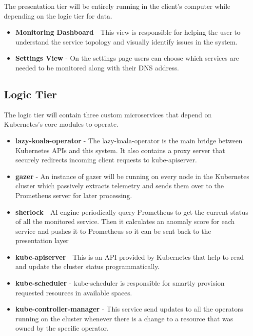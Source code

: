 The presentation tier will be entirely running in the client's computer while depending on the logic tier for data.

\begin{itemize}
    \item \textbf{Monitoring Dashboard} - This view is responsible for helping the user to understand the service topology and visually identify issues in the system.
    \item \textbf{Settings View} - On the settings page users can choose which services are needed to be monitored along with their DNS address.
\end{itemize}

\subsection{Logic Tier}

The logic tier will contain three custom microservices that depend on Kubernetes's core modules to operate.

\begin{itemize}
    \item \textbf{\ac{lazy-koala-operator}} - The \ac{lazy-koala-operator} is the main bridge between Kubernetes APIs and this system. It also contains a proxy server that securely redirects incoming client requests to kube-apiserver.
    \item \textbf{\ac{gazer}} - An instance of \ac{gazer} will be running on every node in the Kubernetes cluster which passively extracts telemetry and sends them over to the Prometheus server for later processing.
    \item \textbf{\ac{sherlock}} - AI engine periodically query Prometheus to get the current status of all the monitored service. Then it calculates an anomaly score for each service and pushes it to Prometheus so it can be sent back to the presentation layer
    \item \textbf{kube-apiserver} - This is an API provided by Kubernetes that help to read and update the cluster status programmatically.
    \item \textbf{kube-scheduler} - kube-scheduler is responsible for smartly provision requested resources in available spaces.
    \item \textbf{kube-controller-manager} - This service send updates to all the operators running on the cluster whenever there is a change to a resource that was owned by the specific operator.
\end{itemize}

